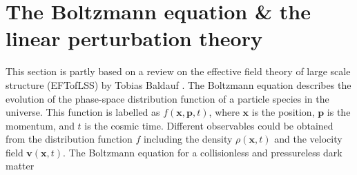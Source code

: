 \section{The Boltzmann equation \& the linear perturbation theory} \label{sec:boltzmann}
This section is partly based on a review on the effective field theory of large scale structure (EFTofLSS) by Tobias Baldauf \citep{Baldauf_EFTLSS_2020}. The Boltzmann equation describes the evolution of the phase-space distribution function of a particle species in the universe. This function is labelled as $f(\mathbf{x}, \mathbf{p}, t)$, where $\mathbf{x}$ is the position, $\mathbf{p}$ is the momentum, and $t$ is the cosmic time. Different observables could be obtained from the distribution function $f$ including the density $\rho(\mathbf{x}, t)$ and the velocity field $\mathbf{v}(\mathbf{x}, t)$. The Boltzmann equation for a collisionless and pressureless dark matter

